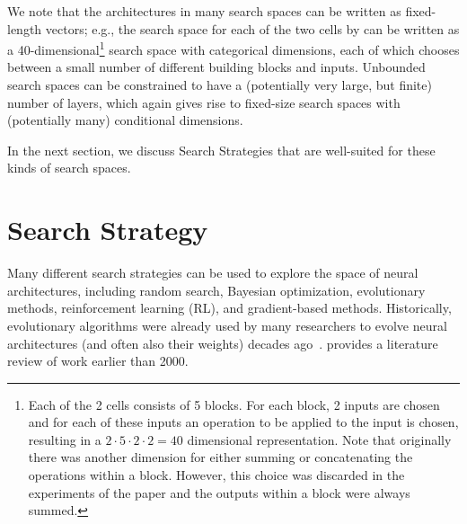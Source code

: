 \documentclass[twoside,11pt]{article}
\newcommand{\note}[1]{
	\noindent~\\
	\vspace{0.25cm}
	\fcolorbox{red}{yellow}{\parbox{0.97\textwidth}{#1\\}}
	\vspace{0.25cm}
}
\begin{document}
We note that the architectures in many search spaces can be written as fixed-length vectors; e.g., the search space for each of the two cells by  \citet{DBLP:journals/corr/ZophVSL17} can be written as a 40-dimensional\footnote{Each of the 2 cells consists of 5 blocks. For each block, 2 inputs are chosen and for each of these inputs an operation to be applied to the input is chosen, resulting in a $2 \cdot 5 \cdot 2 \cdot 2 = 40$ dimensional representation. Note that originally there was another dimension for either summing or concatenating the operations within a block. However, this choice was discarded in the experiments of the paper and the outputs within a block were always summed.} search space with categorical dimensions, each of which chooses between a small number of different building blocks and inputs. 
Unbounded search spaces can be constrained to have a (potentially very large, but finite) number of layers, which again gives rise to fixed-size search spaces with (potentially many) conditional dimensions.

In the next section, we discuss Search Strategies that are well-suited for these kinds of search spaces. 



\section{Search Strategy}\label{Section:search_heuristic} 

Many different search strategies can be used to explore the space of neural architectures, including random search, Bayesian optimization, evolutionary methods, reinforcement learning (RL), and gradient-based methods. Historically, evolutionary algorithms were already used by many researchers to evolve neural architectures (and often also their weights) decades ago~\citep[see, e.g.,][]{Angeline1994AnEA,stanley_evolving_2002, Floreano112676, Stanley:2009:HEE:1516090.1516093,pmlr-v37-jozefowicz15}. \citet{yao_evolving_1999} provides a literature review of work earlier than 2000.
\end{document}
